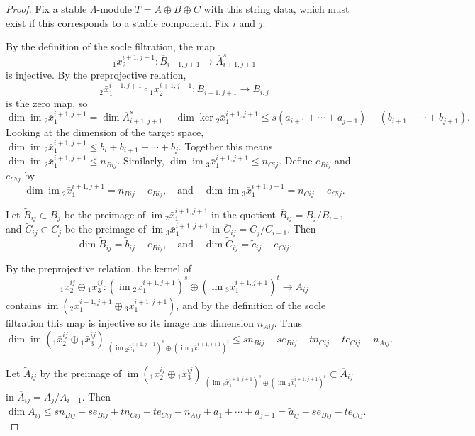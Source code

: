\documentclass[10pt,a4paper]{amsart}
\newcommand{\im}{\operatorname{im}}
\begin{document}
\begin{proof}
Fix a stable $\Lambda$-module $T=A\oplus B \oplus C$ with this string data, which must exist if this corresponds to a stable component. Fix $i$ and $j$. 

By the definition of the socle filtration, the map
$${}_1x^{i+1,j+1}_2 :  \overline B_{i+1,j+1}  \rightarrow \overline A_{i+1,j+1}^s$$
is injective. By the preprojective relation,
$$ {}_2 \bar x^{i+1,j+1}_1 \circ {}_1x^{i+1,j+1}_2 :  \overline B_{i+1,j+1} \rightarrow  \overline B_{i,j}$$
is the zero map, 
so 
$$\dim \im  {}_2 \bar x^{i+1,j+1}_1 = \dim \overline A_{i+1,j+1}^s - \dim \ker {}_2 \bar x^{i+1,j+1}_1  \leq s(a_{i+1}+\cdots+a_{j+1})-(b_{i+1}+\cdots+b_{j+1}).$$
Looking at the dimension of the target space, $\dim \im  {}_2 \bar x^{i+1,j+1}_1 \leq b_i+b_{i+1}+\cdots+b_{j}$. Together this means $\dim \im  {}_2 \bar x^{i+1,j+1}_1 \leq n_{Bij}$. Similarly, 
$\dim \im  {}_3 \bar x^{i+1,j+1}_1 \leq n_{Cij}.$ Define $e_{Bij}$ and $e_{Cij}$ by
$$
\dim  \im  {}_2 \bar x^{i+1,j+1}_1 =  n_{Bij} - e_{Bij}, \quad \text{and} \quad \dim \im  {}_3 \bar x^{i+1,j+1}_1  = n_{Cij} - e_{Cij}.
$$

Let $\tilde B_{ij} \subset B_j$ be the preimage of $\im  {}_2 \bar x^{i+1,j+1}_1$ in the quotient $\overline B_{ij}= B_j/B_{i-1}$ and $\tilde C_{ij} \subset C_j$ be the preimage of $\im  {}_3 \bar x^{i+1,j+1}_1$ in $\overline C_{ij}= C_j/C_{i-1}.$ Then
$$
\dim \tilde B_{ij} = \tilde b_{ij} - e_{Bij}, \quad \text{and} \quad \dim \tilde C_{ij} = \tilde c_{ij} - e_{Cij}.
$$

By the preprojective relation, the kernel of
$${}_1 \bar x^{ij}_2 \oplus {}_1 \bar x^{ij}_3 : (\im  {}_2 \bar x^{i+1,j+1}_1)^s \oplus (\im  {}_3 \bar x^{i+1,j+1}_1)^t \rightarrow \overline A_{ij}$$
contains $\im ( {}_2  x^{i+1,j+1}_1 \oplus {}_3 x^{i+1,j+1}_1)$, and by the definition of the socle filtration this map is injective so its image has dimension $n_{Aij}.$ Thus
$$\dim \im ( {}_1 \bar x^{ij}_2 \oplus {}_1 \bar x^{ij}_3 )|_{ (\im  {}_2 \bar x^{i+1,j+1}_1)^s \oplus (\im  {}_3 \bar x^{i+1,j+1}_1)^t }\leq sn_{Bij} - se_{Bij}+t n_{Cij} - te_{Cij} - n_{Aij}.$$

Let $\tilde A_{ij}$ by the preimage of $\im ( {}_1 \bar x^{ij}_2 \oplus {}_1 \bar x^{ij}_3 )|_{ (\im  {}_2 \bar x^{i+1,j+1}_1)^s \oplus (\im  {}_3 \bar x^{i+1,j+1}_1)^t } \subset  \overline A_{ij}$ in $\overline A_{ij}= A_j/A_{i-1}$. Then 
$$\dim \tilde A_{ij} \leq  sn_{Bij} - se_{Bij}+t n_{Cij} - te_{Cij} - n_{Aij} + a_1+ \cdots + a_{j-1}= \tilde a_{ij} - se_{Bij} - te_{Cij}.$$ 


\end{proof}
\end{document}
